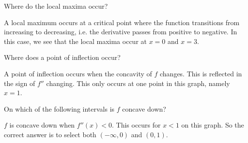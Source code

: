 \documentclass{ximera}
\begin{document}
\begin{example}
  \begin{question}
    Where do the local maxima occur?
    \begin{selectAll}
    \end{selectAll}
    \begin{hint}
      A local maximum occurs at a critical point where the function
      transitions from increasing to decreasing, i.e. the derivative
      passes from positive to negative.  In this case, we see that the
      local maxima occur at $x=0$ and $x=3$.
    \end{hint}
  \end{question}
  
  \begin{question}
    Where does a point of inflection occur?
    \begin{selectAll}
\end{selectAll}
    
    \begin{hint}
      A point of inflection occurs when the concavity of $f$ changes.  This is reflected in the sign of $f''$ changing.  This only occurs at one point in this graph, namely $x=1$.
    \end{hint}
    
  \end{question}

  \begin{question}
    On which of the following intervals is $f$ concave down?
    \begin{selectAll}
    \end{selectAll}
    
    \begin{hint}
      $f$ is concave down when $f''(x)<0$.  This occurs for $x<1$ on this graph.  So the correct answer is to select both $(-\infty, 0)$ and $(0,1)$. 
    \end{hint}
  \end{question}
  
  
\end{example}
\end{document}
